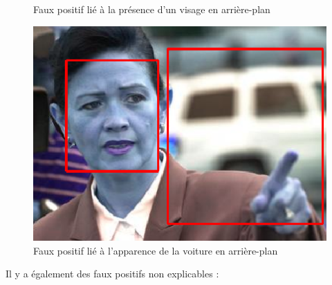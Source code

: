 \documentclass[a4paper,11pt]{article}
\begin{document}
\begin{figure}[H]
\begin{minipage}[c]{0.45\linewidth}
\begin{center}
            \caption{Faux positif lié à la présence d'un visage en arrière-plan}
        \end{center}
    \end{minipage}
\end{figure}

\begin{figure}[H]
    \begin{center}
        \includegraphics[scale=0.45]{facenetFP5.png}
        \caption{Faux positif lié à l'apparence de la voiture en arrière-plan}
    \end{center}
\end{figure}

Il y a également des faux positifs non explicables :\\
\end{document}
